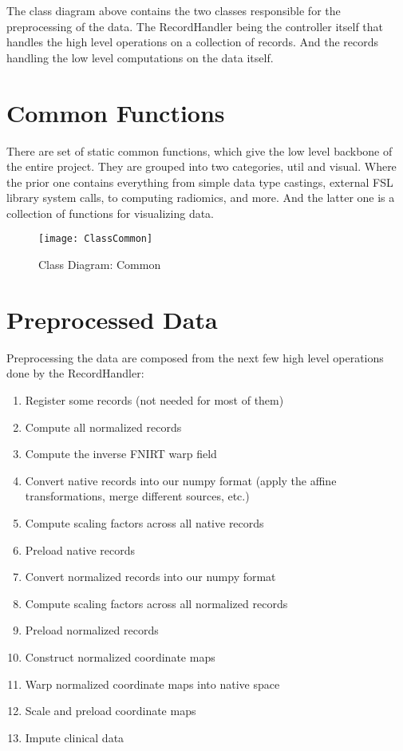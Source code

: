 The class diagram above contains the two classes responsible for the preprocessing of the data. The RecordHandler being the controller itself that handles the high level operations on a collection of records. And the records handling the low level computations on the data itself.

\section{Common Functions}

There are set of static common functions, which give the low level backbone of the entire project. They are grouped into two categories, util and visual. Where the prior one contains everything from simple data type castings, external \ac{FSL} library system calls, to computing radiomics, and more. And the latter one is a collection of functions for visualizing data.

\begin{figure}[H]
\centering
\texttt{[image: ClassCommon]}
\caption{Class Diagram: Common}
\end{figure}

\section{Preprocessed Data}

Preprocessing the data are composed from the next few high level operations done by the RecordHandler:
\begin{enumerate}
  \item Register some records (not needed for most of them)
  \item Compute all normalized records
  \item Compute the inverse \ac{FNIRT} warp field
  \item Convert native records into our numpy format (apply the affine transformations, merge different sources, etc.)
  \item Compute scaling factors across all native records
  \item Preload native records
  \item Convert normalized records into our numpy format
  \item Compute scaling factors across all normalized records
  \item Preload normalized records
  \item Construct normalized coordinate maps
  \item Warp normalized coordinate maps into native space
  \item Scale and preload coordinate maps
  \item Impute clinical data
\end{enumerate}

